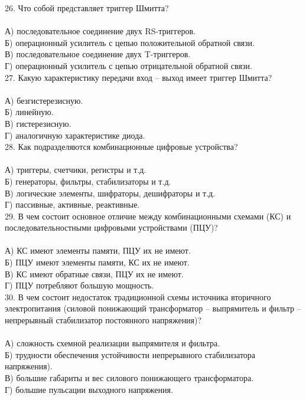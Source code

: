 26. Что собой представляет триггер Шмитта?\\\\
А) последовательное соединение двух RS-триггеров.\\
Б) операционный усилитель с цепью положительной обратной связи.\\
В) последовательное соединение двух T-триггеров.\\
Г) операционный усилитель с цепью отрицательной обратной связи.\\

27. Какую характеристику передачи вход – выход имеет триггер Шмитта?\\\\
А) безгистерезисную.\\
Б) линейную.\\
В) гистерезисную.\\
Г) аналогичную характеристике диода.\\

28. Как подразделяются комбинационные цифровые устройства?\\\\
А) триггеры, счетчики, регистры и т.д.\\
Б) генераторы, фильтры, стабилизаторы и т.д.\\
В) логические элементы, шифраторы, дешифраторы и т.д.\\
Г) пассивные, активные, реактивные.\\

29. В чем состоит основное отличие между комбинационными схемами (КС) и последовательностными цифровыми устройствами (ПЦУ)?\\\\
А) КС имеют элементы памяти, ПЦУ их не имеют.\\
Б) ПЦУ имеют элементы памяти, КС их не имеют.\\
В) КС имеют обратные связи, ПЦУ их не имеют.\\
Г) ПЦУ потребляют большую мощность.\\

30. В чем состоит недостаток традиционной схемы источника вторичного электропитания (силовой понижающий трансформатор – выпрямитель и фильтр – непрерывный стабилизатор постоянного напряжения)?\\\\
А) сложность схемной реализации выпрямителя и фильтра.\\
Б) трудности обеспечения устойчивости непрерывного стабилизатора напряжения).\\
В) большие габариты и вес силового понижающего трансформатора.\\
Г) большие пульсации выходного напряжения.\\

